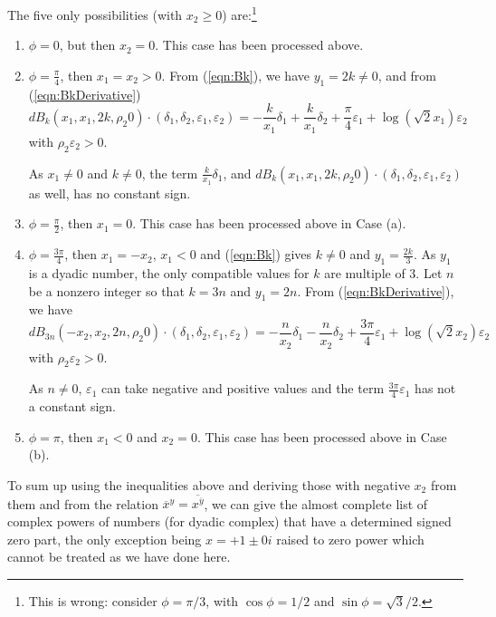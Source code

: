 \documentclass [12pt]{article}
\renewcommand {\epsilon}{\varepsilon}
\renewcommand {\geq}{\geqslant}
\begin{document}
\begin {enumerate}
  The five only possibilities (with $x_2 \geq 0$) are:\footnote{This is wrong:
 consider $\phi = \pi/3$, with $\cos \phi = 1/2$ and $\sin \phi = \sqrt{3}/2$.}
  \begin{enumerate}
  \item $\phi = 0$, but then $x_2=0$.
    This case has been processed above.
  \item $\phi = \frac{\pi}{4}$, then $x_1 = x_2 > 0$.
    From (\ref{eqn:Bk}), we have $y_1 = 2k \neq 0$, and from
    (\ref{eqn:BkDerivative})
    \[
    dB_k(x_1, x_1, 2k, \rho_2 0)\cdot(\delta_1, \delta_2, \epsilon_1,
    \epsilon_2) = -\frac{k}{x_1}\delta_1 + \frac{k}{x_1}\delta_2 +
    \frac{\pi}{4}\epsilon_1 + \log(\sqrt{2}x_1)\epsilon_2
    \]
    with $\rho_2\epsilon_2>0$.

    As $x_1 \neq 0$ and $k \neq 0$, the term $\frac{k}{x_1}\delta_1$, and
    $dB_k(x_1, x_1, 2k, \rho_2 0)\cdot(\delta_1, \delta_2, \epsilon_1,
    \epsilon_2)$ as well, has no constant sign.
  \item $\phi = \frac{\pi}{2}$, then $x_1 = 0$.
    This case has been processed above in Case (a).
  \item $\phi = \frac{3\pi}{4}$, then $x_1 = -x_2$, $x_1 < 0$ and
    (\ref{eqn:Bk}) gives $k \neq 0$ and $y_1 = \frac{2k}{3}$.
    As $y_1$ is a dyadic number, the only compatible values for $k$ are
    multiple of 3.
    Let $n$ be a nonzero integer so that $k = 3n$ and $y_1 = 2n$.
    From (\ref{eqn:BkDerivative}), we have
    \[
    dB_{3n}(-x_2, x_2, 2n, \rho_2 0)\cdot(\delta_1, \delta_2, \epsilon_1,
    \epsilon_2) = -\frac{n}{x_2}\delta_1 - \frac{n}{x_2}\delta_2 +
    \frac{3\pi}{4}\epsilon_1 + \log(\sqrt{2}x_2)\epsilon_2
    \]
    with $\rho_2\epsilon_2 >0$.

    As $n \neq 0$, $\epsilon_1$ can take negative and positive values and
    the term $\frac{3\pi}{4}\epsilon_1$ has not a constant sign.
  \item $\phi = \pi$, then $x_1<0$ and $x_2 = 0$.
    This case has been processed above in Case (b).
  \end{enumerate}
\end {enumerate}

To sum up using the inequalities above and deriving those with negative $x_2$
from them and from the relation $\overline{x}^y =
\overline{x^{\overline{y}}}$, we can give the almost complete list of complex
powers of numbers (for dyadic complex) that have a determined signed zero
part, the only exception being $x=+1 \pm 0i$ raised to zero power which cannot
be treated as we have done here.
\end{document}

